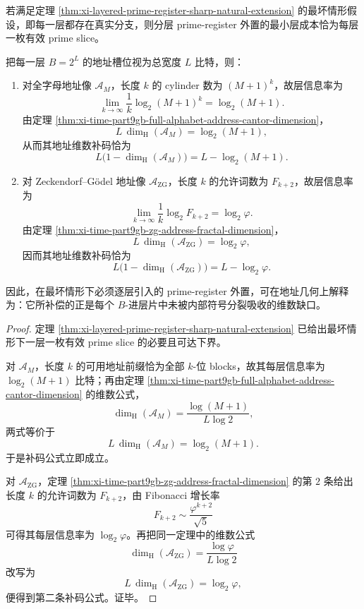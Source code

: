 \begin{corollary}\label{cor:xi-time-part9gb-prime-register-dimension-complement}
若满足定理 \ref{thm:xi-layered-prime-register-sharp-natural-extension} 的最坏情形假设，即每一层都存在真实分支，则分层 prime-register 外置的最小层成本恰为每层一枚有效 prime slice。

把每一层 \(B=2^L\) 的地址槽位视为总宽度 \(L\) 比特，则：
\begin{enumerate}
  \item 对全字母地址像 \(\mathcal A_M\)，长度 \(k\) 的 cylinder 数为 \((M+1)^k\)，故层信息率为
  \[
  \lim_{k\to\infty}\frac{1}{k}\log_2 (M+1)^k=\log_2(M+1).
  \]
  由定理 \ref{thm:xi-time-part9gb-full-alphabet-address-cantor-dimension}，
  \[
  L\,\dim_{\mathrm H}(\mathcal A_M)=\log_2(M+1),
  \]
  从而其地址维数补码恰为
  \[
  L\bigl(1-\dim_{\mathrm H}(\mathcal A_M)\bigr)
  =
  L-\log_2(M+1).
  \]
  \item 对 Zeckendorf--Gödel 地址像 \(\mathcal A_{\mathrm{ZG}}\)，长度 \(k\) 的允许词数为 \(F_{k+2}\)，故层信息率为
  \[
  \lim_{k\to\infty}\frac{1}{k}\log_2 F_{k+2}=\log_2\varphi.
  \]
  由定理 \ref{thm:xi-time-part9gb-zg-address-fractal-dimension}，
  \[
  L\,\dim_{\mathrm H}(\mathcal A_{\mathrm{ZG}})=\log_2\varphi,
  \]
  因而其地址维数补码恰为
  \[
  L\bigl(1-\dim_{\mathrm H}(\mathcal A_{\mathrm{ZG}})\bigr)
  =
  L-\log_2\varphi.
  \]
\end{enumerate}
因此，在最坏情形下必须逐层引入的 prime-register 外置，可在地址几何上解释为：它所补偿的正是每个 \(B\)-进层片中未被内部符号分裂吸收的维数缺口。
\end{corollary}
\begin{proof}
定理 \ref{thm:xi-layered-prime-register-sharp-natural-extension} 已给出最坏情形下一层一枚有效 prime slice 的必要且可达下界。

对 \(\mathcal A_M\)，长度 \(k\) 的可用地址前缀恰为全部 \(k\)-位 blocks，故其每层信息率为 \(\log_2(M+1)\) 比特；再由定理 \ref{thm:xi-time-part9gb-full-alphabet-address-cantor-dimension} 的维数公式，
\[
\dim_{\mathrm H}(\mathcal A_M)=\frac{\log(M+1)}{L\log 2},
\]
两式等价于
\[
L\,\dim_{\mathrm H}(\mathcal A_M)=\log_2(M+1).
\]
于是补码公式立即成立。

对 \(\mathcal A_{\mathrm{ZG}}\)，定理 \ref{thm:xi-time-part9gb-zg-address-fractal-dimension} 的第 \(2\) 条给出长度 \(k\) 的允许词数为 \(F_{k+2}\)，由 Fibonacci 增长率
\[
F_{k+2}\sim \frac{\varphi^{k+2}}{\sqrt5}
\]
可得其每层信息率为 \(\log_2\varphi\)。再把同一定理中的维数公式
\[
\dim_{\mathrm H}(\mathcal A_{\mathrm{ZG}})=\frac{\log\varphi}{L\log 2}
\]
改写为
\[
L\,\dim_{\mathrm H}(\mathcal A_{\mathrm{ZG}})=\log_2\varphi,
\]
便得到第二条补码公式。证毕。
\end{proof}

\endinput
